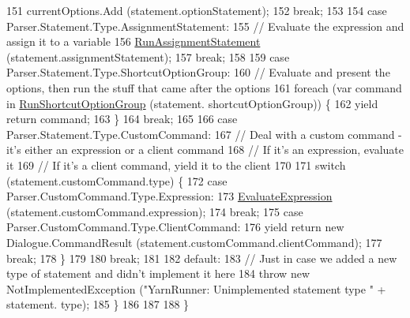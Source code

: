 \begin{DoxyCode}
151                 currentOptions.Add (statement.optionStatement);
152                 \textcolor{keywordflow}{break};
153 
154             \textcolor{keywordflow}{case} Parser.Statement.Type.AssignmentStatement:
155                 \textcolor{comment}{// Evaluate the expression and assign it to a variable}
156                 \hyperlink{a00083_a217c6205821aff5ba31daeb8b3bf2846}{RunAssignmentStatement} (statement.assignmentStatement);
157                 \textcolor{keywordflow}{break};
158 
159             \textcolor{keywordflow}{case} Parser.Statement.Type.ShortcutOptionGroup:
160                 \textcolor{comment}{// Evaluate and present the options, then run the stuff that came after the options}
161                 \textcolor{keywordflow}{foreach} (var command \textcolor{keywordflow}{in} \hyperlink{a00083_a231488eace774d92f5c55034d075016d}{RunShortcutOptionGroup} (statement.
      shortcutOptionGroup)) \{
162                     yield \textcolor{keywordflow}{return} command;
163                 \}
164                 \textcolor{keywordflow}{break};
165 
166             \textcolor{keywordflow}{case} Parser.Statement.Type.CustomCommand:
167                 \textcolor{comment}{// Deal with a custom command - it's either an expression or a client command}
168                 \textcolor{comment}{// If it's an expression, evaluate it}
169                 \textcolor{comment}{// If it's a client command, yield it to the client}
170 
171                 \textcolor{keywordflow}{switch} (statement.customCommand.type) \{
172                 \textcolor{keywordflow}{case} Parser.CustomCommand.Type.Expression:
173                     \hyperlink{a00083_ac57271c72da4ec456a32c94d951c8b65}{EvaluateExpression} (statement.customCommand.expression);
174                     \textcolor{keywordflow}{break};
175                 \textcolor{keywordflow}{case} Parser.CustomCommand.Type.ClientCommand:
176                     yield \textcolor{keywordflow}{return} \textcolor{keyword}{new} Dialogue.CommandResult (statement.customCommand.clientCommand);
177                     \textcolor{keywordflow}{break};
178                 \}
179 
180                 \textcolor{keywordflow}{break};
181 
182             \textcolor{keywordflow}{default}:
183                 \textcolor{comment}{// Just in case we added a new type of statement and didn't implement it here}
184                 \textcolor{keywordflow}{throw} \textcolor{keyword}{new} NotImplementedException (\textcolor{stringliteral}{"YarnRunner: Unimplemented statement type "} + statement.
      type);
185             \}
186         
187 
188         \}
\end{DoxyCode}
